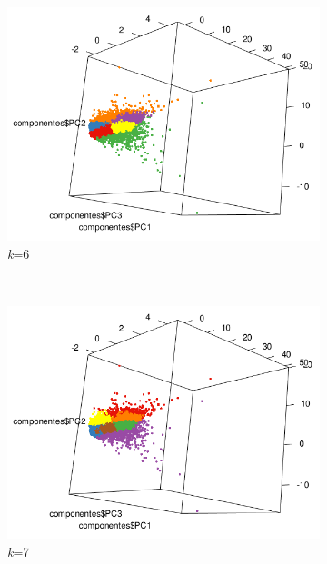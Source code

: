 \documentclass[12pt]{article}
\numberwithin{equation}{section}
\numberwithin{table}{section}
\numberwithin{figure}{section}
\begin{document}
\begin{figure}
\begin{subfigure}[b]{0.33\textwidth}
                \includegraphics[width=1\textwidth]{imagenes/k6}
                \caption{\emph{k}=6}
        \end{subfigure}
        ~
        \begin{subfigure}[b]{0.33\textwidth}
                \includegraphics[width=1\textwidth]{imagenes/k7}
                \caption{\emph{k}=7}
        \end{subfigure}
        ~
        \begin{subfigure}[b]{0.33\textwidth}

\end{subfigure}
\end{figure}
\end{document}
